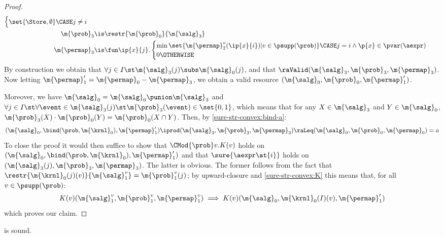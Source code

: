 \documentclass[acmsmall,nonacm,screen,appendix]{acmart}
\begin{document}
\begin{proof}
\begin{align*}
\begin{cases}
        \set{\Store, \emptyset}
        \CASE j \ne i
      \end{cases}
    \\
    \m{\prob}_3 &\is \restr{\m{\prob}_0}{\m{\salg}_3}
    \\
    \m{\permap}_3 &\is
      \fun \ip{x}{j}.
      \begin{cases}
        \min
          \set{\m{\permap}^v_2(\ip{x}{i}) | v \in \psupp(\prob)}
        \CASE j=i \land \p{x} \in \pvar(\aexpr) \\
        0 \OTHERWISE
      \end{cases}
  \end{align*}
  By construction we obtain that
  $ \forall j\in I\st \m{\salg}_3(j) \subs \m{\salg}_0(j) $,
and that
  $\raValid(\m{\salg}_3, \m{\prob}_3, \m{\permap}_3)$.
Now letting
  $
   \m{\permap}_1' = {\m{\permap}_0-\m{\permap}_3}
  $,
  we obtain a valid resource
  $(\m{\salg}_0, \m{\prob}_0, \m{\permap}_1')$.


  Moreover,
  we have
  $
    \m{\salg}_0 = \m{\salg}_0 \punion \m{\salg}_3
  $
  and
  $
    \forall j\in I\st
    \forall\event\in\m{\salg}_3(j)\st
      \m{\prob}_3(\event)\in\set{0,1}
  $,
  which means that
  for any $X \in \m{\salg}_3$ and $Y \in \m{\salg}_0$,
  $\m{\prob}_3(X) \cdot \m{\prob}_0(Y) = \m{\prob}_0(X \cap Y)$.
  Then, by \eqref{sure-str-convex:bind-a}:
  \[
    (\m{\salg}_0, \bind(\prob, \m{\krnl}_0), \m{\permap}_1')
    \iprod
    (\m{\salg}_3, \m{\prob}_3, \m{\permap}_3)
    \raLeq
    (\m{\salg}_0, \m{\prob}_0, \m{\permap}_0) = a
  \]
  To close the proof it would then suffice to show that
  $ \CMod{\prob} v. K(v) $
  holds on
  $(\m{\salg}_0, \bind(\prob, \m{\krnl}_0), \m{\permap}_1')$
  and that
  $ \sure{\aexpr\at{i}} $
  holds on
  $ (\m{\salg}_3(j),\m{\prob}_3,\m{\permap}_3) $.
  The latter is obvious.
  The former follows from
  the fact that $ \restr{\m{\krnl}_0(j)(v)}{\m{\salg}^v_1} = \m{\prob}^v_1(j) $;
  by upward-closure and \eqref{sure-str-convex:K}
  this means that, for all $v \in \psupp(\prob)$:
  \[
    K(v)(\m{\salg}^v_1, \m{\prob}^v_1, \m{\permap}^v_1)
    \implies
    K(v)(\m{\salg}_0, \m{\krnl}_0(I)(v), \m{\permap}_1')
  \]
  which proves our claim.
\end{proof}
 \begin{lemma}
\label{proof:c-for-all}
   is sound.
\end{lemma}
\end{document}
